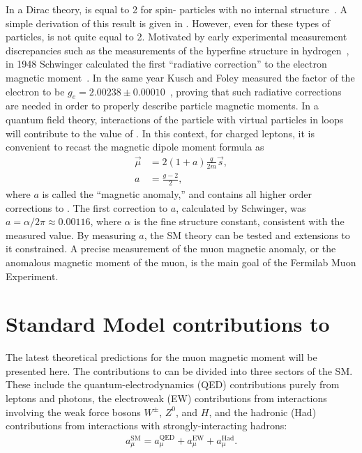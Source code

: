 In a Dirac theory, \g is equal to 2 for spin-\textonehalf\xspace particles with no internal structure~\cite{Dirac}. A simple derivation of this result is given in . However, even for these types of particles, \g is not quite equal to 2. Motivated by early experimental measurement discrepancies such as the measurements of the hyperfine structure in hydrogen~\cite{EarlyHyperfine1}, in 1948 Schwinger calculated the first ``radiative correction'' to the electron magnetic moment~\cite{Schwinger}. In the same year Kusch and Foley measured the \g factor of the electron to be $g_{e} = 2.00238 \pm 0.00010$~\cite{KuschFoley1,KuschFoley2}, proving that such radiative corrections are needed in order to properly describe particle magnetic moments. In a quantum field theory, interactions of the particle with virtual particles in loops will contribute to the value of \g. In this context, for charged leptons, it is convenient to recast the magnetic dipole moment formula as 
		\begin{equation}
		\begin{aligned}
            \vec{\mu} &= 2(1+a) \frac{q}{2m} \vec{s}, \\
            a &= \frac{g-2}{2},
        \label{eq:anamoly}
		\end{aligned}
		\end{equation}
where $a$ is called the ``magnetic anomaly,'' and contains all higher order corrections to \g. The first correction to $a$, calculated by Schwinger, was $a = \alpha/2\pi \approx 0.00116$, where $\alpha$ is the fine structure constant, consistent with the measured value. By measuring $a$, the SM theory can be tested and extensions to it constrained. A precise measurement of the muon magnetic anomaly, or the anomalous magnetic moment of the muon, is the main goal of the Fermilab Muon \gmtwo Experiment.


\section{Standard Model contributions to \amu}
\label{sec:Theory}

The latest theoretical predictions for the muon magnetic moment will be presented here. The contributions to \amu can be divided into three sectors of the SM. These include the quantum-electrodynamics (QED) contributions purely from leptons and photons, the electroweak (EW) contributions from interactions involving the weak force bosons $W^{\pm}$, $Z^{0}$, and $H$, and the hadronic (Had) contributions from interactions with strongly-interacting hadrons:
		\begin{align}
            a_{\mu}^{\text{SM}} = a_{\mu}^{\text{QED}} + a_{\mu}^{\text{EW}} + a_{\mu}^{\text{Had}}.
		\end{align}


